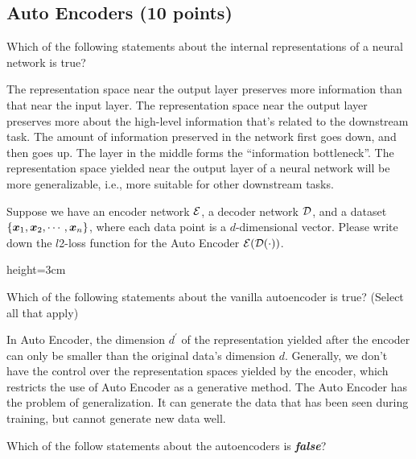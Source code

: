 \subsection{Auto Encoders (10 points)} 
\begin{questions}
    \question[2] Which of the following statements about the internal representations of a neural network is true?
    
    \begin{checkboxes}
        \choice The representation space near the output layer preserves more information than that near the input layer. 
        \choice The representation space near the output layer preserves more about the high-level information that's related to the downstream task. 
        \choice The amount of information preserved in the network first goes down, and then goes up. The layer in the middle forms the ``information bottleneck''.
        \choice The representation space yielded near the output layer of a neural network will be more generalizable, i.e., more suitable for other downstream tasks.
    \end{checkboxes}
    
    \question[3] Suppose we have an encoder network ${\mathcal{E}}$, a decoder network ${\mathcal{D}}$, and a dataset $\{{\bm{x}}_1, {\bm{x}}_2, \cdots, {\bm{x}}_n\}$, where each data point is a $d$-dimensional vector. Please write down the $l$2-loss function for the Auto Encoder ${\mathcal{E}}({\mathcal{D}}(\cdot))$. 
    
    \begin{soln}{height=3cm}
    \end{soln}
    
    \question[2] Which of the following statements about the vanilla autoencoder is true? (Select all that apply)
    
    \begin{checkboxes}
        \choice In Auto Encoder, the dimension $d^\prime$ of the representation yielded after the encoder can only be smaller than the original data's dimension $d$.
        \choice Generally, we don't have the control over the representation spaces yielded by the encoder, which restricts the use of Auto Encoder as a generative method.
        \choice The Auto Encoder has the problem of generalization. It can generate the data that has been seen during training, but cannot generate new data well.
    \end{checkboxes}
    
    \question[3] Which of the follow statements about the autoencoders is \textit{\textbf{false}}?
    

\end{questions}
